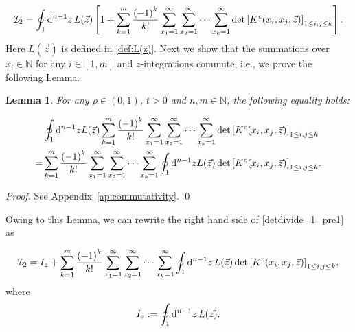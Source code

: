 \documentclass[cmp]{svjour}
\numberwithin{theorem}{section}
\numberwithin{equation}{section}
\def\dd{{\rm d}}
\newtheorem{lemman}[theorem]{Lemma}
\begin{document}
\begin{equation}
\label{detdivide_1_pre1}
    \mathcal{I}_2 = \oint_{1} \dd^{n-1} z\, L(\vec{z}) \left[1 + \sum_{k=1}^{m}{ \frac{{(-1)}^k}{ k! } } \sum_{x_1 = 1}^{\infty}{ \sum_{x_2 = 1}^{\infty}{  \cdots \sum_{x_k = 1}^{\infty}{ \det\left[ K^c(x_i , x_j , \vec{z}) \right]_{1 \leq i , j \leq k}  } } } \right] .
\end{equation}
Here $L(\vec{z})$ is defined in \eqref{def:L(z)}. 
Next we show that the summations over $x_i\in\mathbb{N}$ for any $i\in[1,m]$ and
$z$-integrations commute, i.e., we prove the following Lemma.

\medskip

\begin{lemman}
\label{commutativity sum and int}
For any $\rho \in (0,1)$, $t>0$ and $n, m \in \mathbb{N}$, the following equality holds:

\begin{equation*}\label{eq:com_integrand_sum}
\begin{split}
&  \oint_{1} \dd^{n-1} z L(\vec{z}) \sum_{k=1}^{m}{ \frac{{(-1)}^k}{ k! } } \sum_{x_1 = 1}^{\infty}{ \sum_{x_2 = 1}^{\infty}{  \cdots \sum_{x_k = 1}^{\infty}{ \det\left[ K^c(x_i , x_j , \vec{z}) \right]_{1 \leq i , j \leq k}  } } } \\
= & \sum_{k=1}^{m}{ \frac{{(-1)}^k}{ k! } } \sum_{x_1 = 1}^{\infty}{ \sum_{x_2 = 1}^{\infty}{  \cdots \sum_{x_k = 1}^{\infty}{   \oint_{1} \dd^{n-1} z L(\vec{z}) \det\left[ K^c(x_i , x_j , \vec{z}) \right]_{1 \leq i , j \leq k}  } } }. 
\end{split}
\end{equation*}

\end{lemman}
\begin{proof}
See Appendix~\ref{ap:commutativity}.
\qed
\end{proof}


Owing to this Lemma, we can rewrite the right hand side of \eqref{detdivide_1_pre1} as 


\begin{equation}
\label{detdivide_1_pre2}
\mathcal{I}_2 =  I_z + \sum_{k=1}^{m}{ \frac{{(-1)}^k}{k!} } \sum_{x_1 = 1}^{\infty}{ \sum_{x_2 = 1}^{\infty}{ \cdots \sum_{x_k = 1}^{\infty}{ \oint_1 \dd^{n-1} z\,  L(\vec{z}) \det\left[ K^c(x_i, x_j , \vec{z}) \right]_{1 \leq i , j \leq k} } } },
\end{equation}
where
\begin{equation}
\label{def:Iz}
I_z := \oint_1 \dd^{n-1} z\,  L(\vec{z}).
\end{equation}
\end{document}
